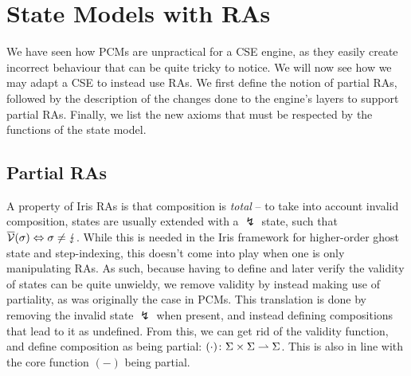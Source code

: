 \section{State Models with RAs} \label{sec:theory-state-model-ras}

We have seen how PCMs are unpractical for a CSE engine, as they easily create incorrect behaviour that can be quite tricky to notice. We will now see how we may adapt a CSE to instead use RAs. We first define the notion of partial RAs, followed by the description of the changes done to the engine's layers to support partial RAs. Finally, we list the new axioms that must be respected by the functions of the state model.

\subsection{Partial RAs}

A property of Iris RAs is that composition is \emph{total} -- to take into account invalid composition, states are usually extended with a $\lightning$ state, such that $\overline{\cal V}(\sigma)\Leftrightarrow \sigma\neq\lightning$. While this is needed in the Iris framework for higher-order ghost state and step-indexing, this doesn't come into play when one is only manipulating RAs. As such, because having to define and later verify the validity of states can be quite unwieldy, we remove validity by instead making use of partiality, as was originally the case in PCMs. This translation is done by removing the invalid state $\lightning$ when present, and instead defining compositions that lead to it as undefined. From this, we can get rid of the validity function, and define composition as being partial: $(\cdot)\colon \Sigma\times \Sigma\rightharpoonup \Sigma$. This is also in line with the core function $(-)$ being partial.

